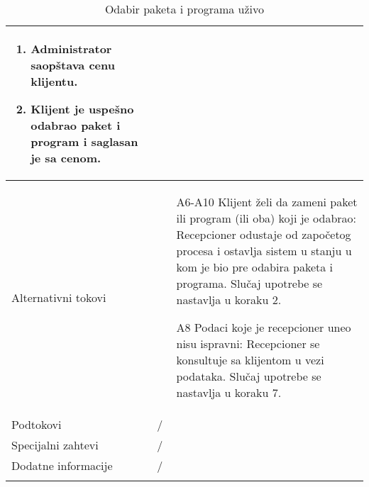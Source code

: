 \documentclass[../main.tex]{subfiles}
\begin{document}
\begin{longtable}{| p{} | p{} |}
\begin{enumerate}
        \item Administrator saopštava cenu klijentu.
        \item Klijent je uspešno odabrao paket i program i saglasan je sa cenom.
    \end{enumerate}\\
\hline
    Alternativni tokovi & \begin{itemize}
        \item [A6-A10] Klijent želi da zameni paket ili program (ili oba) koji je odabrao: Recepcioner odustaje od započetog procesa i ostavlja sistem u stanju u kom je bio pre odabira paketa i programa. Slučaj upotrebe se nastavlja u koraku 2.
        \item [A8] Podaci koje je recepcioner uneo nisu ispravni: Recepcioner se konsultuje sa klijentom u vezi podataka. Slučaj upotrebe se nastavlja u koraku 7.
    \end{itemize}\\
\hline
    Podtokovi & /\\
\hline
    Specijalni zahtevi & /\\
\hline
    Dodatne informacije & /\\
\hline
\caption{Odabir paketa i programa uživo} %
\end{longtable}
\end{document}
